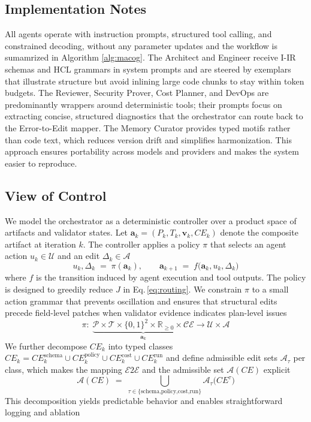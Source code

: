 \documentclass[acmsmall,screen,review,anonymous]{acmart}
\begin{document}
\subsection{Implementation Notes}
\label{sec:nofinetune}

All agents operate with instruction prompts, structured tool calling, and constrained decoding, without any parameter updates and the workflow is sumamrized in Algorithm \ref{alg:macog}. The Architect and Engineer receive I-IR schemas and HCL grammars in system prompts and are steered by exemplars that illustrate structure but avoid inlining large code chunks to stay within token budgets. The Reviewer, Security Prover, Cost Planner, and DevOps are predominantly wrappers around deterministic tools; their prompts focus on extracting concise, structured diagnostics that the orchestrator can route back to the Error-to-Edit mapper. The Memory Curator provides typed motifs rather than code text, which reduces version drift and simplifies harmonization. This approach ensures portability across models and providers and makes the system easier to reproduce.

\subsection{View of Control}
\label{sec:math}

We model the orchestrator as a deterministic controller over a product space of artifacts and validator states. Let $\mathbf{a}_k = (P_k, T_k, \mathbf{v}_k, CE_k)$ denote the composite artifact at iteration $k$. The controller applies a policy $\pi$ that selects an agent action $u_k \in \mathcal{U}$ and an edit $\Delta_k \in \mathcal{A}$
\begin{equation}
u_k, \Delta_k \;=\; \pi(\mathbf{a}_k), \qquad \mathbf{a}_{k+1} \;=\; f\big(\mathbf{a}_k, u_k, \Delta_k\big)
\end{equation}
where $f$ is the transition induced by agent execution and tool outputs. The policy is designed to greedily reduce $J$ in Eq.\,\eqref{eq:routing}. We constrain $\pi$ to a small action grammar that prevents oscillation and ensures that structural edits precede field-level patches when validator evidence indicates plan-level issues
\begin{equation}
\pi:\; \underbrace{\mathcal{P} \times \mathcal{T} \times \{0,1\}^2 \times \mathbb{R}_{\ge 0} \times \mathcal{C\!E}}_{\mathbf{a}_k} \rightarrow \mathcal{U} \times \mathcal{A}
\end{equation}
We further decompose $CE_k$ into typed classes $CE_k = CE_k^{\text{schema}} \cup CE_k^{\text{policy}} \cup CE_k^{\text{cost}} \cup CE_k^{\text{run}}$ and define admissible edit sets $\mathcal{A}_\tau$ per class, which makes the mapping $\mathcal{E2E}$ and the admissible set $\mathcal{A}(CE)$ explicit
\begin{equation}
\mathcal{A}(CE) \;=\; \bigcup_{\tau \in \{\text{schema,policy,cost,run}\}} \mathcal{A}_\tau\big( CE^\tau \big)
\end{equation}
This decomposition yields predictable behavior and enables straightforward logging and ablation
\end{document}
